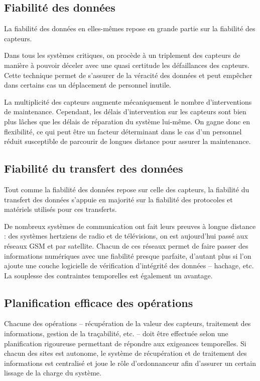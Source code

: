 \documentclass[a4paper, 11pt]{article}
\begin{document}
\subsection{Fiabilité des données}
La fiabilité des données en elles-mêmes repose en grande partie sur la
fiabilité des capteurs.

Dans tous les systèmes critiques, on procède à un triplement des
capteurs de manière à pouvoir déceler avec une quasi certitude les
défaillances des capteurs. Cette technique permet de s'assurer de la
véracité des données et peut empêcher dans certains cas un déplacement
de personnel inutile.

La multiplicité des capteurs augmente mécaniquement le nombre
d'interventions de maintenance. Cependant, les délais d'intervention
sur les capteurs sont bien plus lâches que les délais de réparation du
système lui-même. On gagne donc en flexibilité, ce qui peut être un
facteur déterminant dans le cas d'un personnel réduit susceptible de
parcourir de longues distance pour assurer la maintenance.

\subsection{Fiabilité du transfert des données}
Tout comme la fiabilité des données repose sur celle des capteurs, la
fiabilité du transfert des données s'appuie en majorité sur la
fiabilité des protocoles et matériels utilisés pour ces transferts.

De nombreux systèmes de communication ont fait leurs preuves à longue
distance : des systèmes hertziens de radio et de télévisions, on est
aujourd'hui passé aux réseaux GSM et par satellite. Chacun de ces
réseaux permet de faire passer des informations numériques avec une
fiabilité presque parfaite, d'autant plus si l'on ajoute une couche
logicielle de vérification d'intégrité des données -- hachage,
etc. La souplesse des contraintes temporelles est également
un avantage.

\subsection{Planification efficace des opérations}
Chacune des opérations -- récupération de la valeur des capteurs,
traitement des informations, gestion de la traçabilité,
etc. -- doit être effectuée selon une planification
rigoureuse permettant de répondre aux exigeances temporelles. Si
chacun des sites est autonome, le système de récupération et
de traitement des informations est centralisé et joue le rôle
d'ordonnanceur afin d'assurer un certain lissage de la charge du
système.
\end{document}
